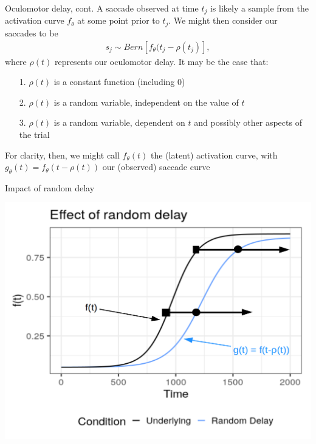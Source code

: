 \documentclass{beamer}
\begin{document}
\begin{frame}{Oculomotor delay, cont.}
A saccade observed at time $t_j$ is likely a sample from the activation curve $f_{\theta}$ at some point prior to $t_j$. We might then consider our saccades to be
\begin{align*}
s_j \sim Bern[f_{\theta}(t_j - \rho(t_j)],
\end{align*}
where $\rho(t)$ represents our oculomotor delay. It may be the case that:

\begin{itemize}
\item[1.] $\rho(t)$ is a constant function (including 0)
\item[2.] $\rho(t)$ is a random variable, independent on the value of $t$
\item[3.] $\rho(t)$ is a random variable, dependent on $t$ and possibly other aspects of the trial
\end{itemize}

For clarity, then, we might call $f_{\theta}(t)$ the (latent) activation curve, with $g_{\theta}(t) = f_{\theta}(t - \rho(t))$ our (observed) saccade curve

\end{frame}


\begin{frame}{Impact of random delay}
\begin{center}
\includegraphics[scale=0.35]{img/full_delay_plot.png}
\end{center}
\end{frame}
\end{document}
